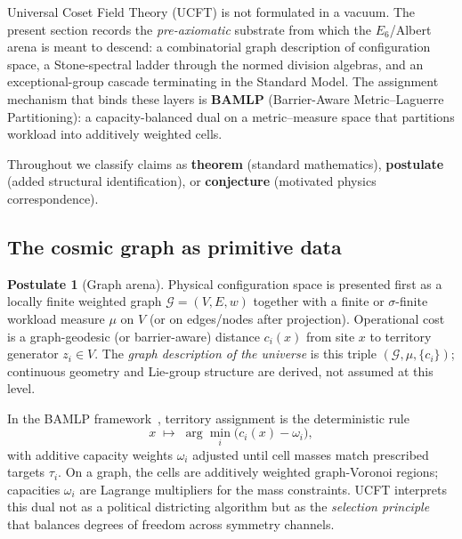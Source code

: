 \documentclass[11pt]{article}
\theoremstyle{plain}
\theoremstyle{definition}
\newtheorem{postulate}[theorem]{Postulate}
\theoremstyle{remark}
\begin{document}
Universal Coset Field Theory (UCFT) is not formulated in a vacuum. The present
section records the \emph{pre-axiomatic} substrate from which the $E_6$/Albert
arena is meant to descend: a combinatorial graph description of configuration
space, a Stone-spectral ladder through the normed division algebras, and an
exceptional-group cascade terminating in the Standard Model. The assignment
mechanism that binds these layers is \textbf{BAMLP} (Barrier-Aware
Metric--Laguerre Partitioning): a capacity-balanced dual on a metric--measure
space that partitions workload into additively weighted cells.

Throughout we classify claims as \textbf{theorem} (standard mathematics),
\textbf{postulate} (added structural identification), or
\textbf{conjecture} (motivated physics correspondence).

\subsection{The cosmic graph as primitive data}
\label{sec:bamlp:graph}

\begin{postulate}[Graph arena]\label{post:bamlp:graph}
Physical configuration space is presented first as a locally finite weighted
graph $\mathcal{G}=(V,E,w)$ together with a finite or $\sigma$-finite workload
measure $\mu$ on $V$ (or on edges/nodes after projection). Operational cost is
a graph-geodesic (or barrier-aware) distance $c_i(x)$ from site $x$ to
territory generator $z_i\in V$. The \emph{graph description of the universe} is
this triple $(\mathcal{G},\mu,\{c_i\})$; continuous geometry and Lie-group
structure are derived, not assumed at this level.
\end{postulate}

In the BAMLP framework~\cite{BAMLP:2026}, territory assignment is the
deterministic rule
\begin{equation}
  x \;\longmapsto\; \arg\min_i\bigl(c_i(x)-\omega_i\bigr),
  \label{eq:bamlp:assign}
\end{equation}
with additive capacity weights $\omega_i$ adjusted until cell masses match
prescribed targets $\tau_i$. On a graph, the cells are additively weighted
graph-Voronoi regions; capacities $\omega_i$ are Lagrange multipliers for the
mass constraints. UCFT interprets this dual not as a political districting
algorithm but as the \emph{selection principle} that balances degrees of
freedom across symmetry channels.
\end{document}
